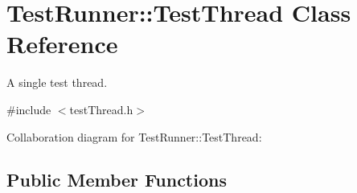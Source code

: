 \hypertarget{classTestRunner_1_1TestThread}{}\section{Test\+Runner\+::Test\+Thread Class Reference}
\label{classTestRunner_1_1TestThread}


A single test thread.  




{\ttfamily \#include $<$test\+Thread.\+h$>$}



Collaboration diagram for Test\+Runner\+::Test\+Thread\+:
\subsection*{Public Member Functions}
